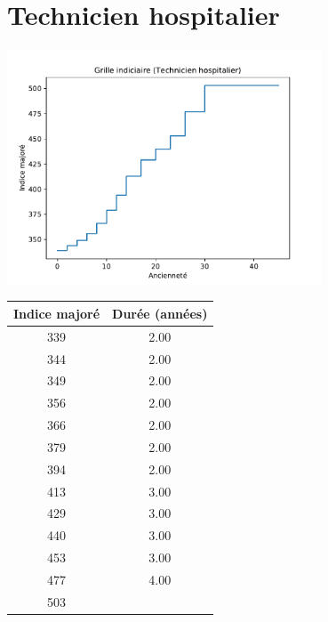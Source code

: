 \newpage 
 
\chapter{Technicien hospitalier} 

\begin{minipage}{0.55\linewidth}\includegraphics[width=0.7\textwidth]{fig/grille_TechHosp.pdf}\end{minipage} 
\begin{minipage}{0.3\linewidth} 
 \begin{center} 

\begin{tabular}[htb]{|c|c|} 
\hline 
 Indice majoré &  Durée (années) \\ 
\hline \hline 
 339 &  2.00 \\ 
\hline 
 344 &  2.00 \\ 
\hline 
 349 &  2.00 \\ 
\hline 
 356 &  2.00 \\ 
\hline 
 366 &  2.00 \\ 
\hline 
 379 &  2.00 \\ 
\hline 
 394 &  2.00 \\ 
\hline 
 413 &  3.00 \\ 
\hline 
 429 &  3.00 \\ 
\hline 
 440 &  3.00 \\ 
\hline 
 453 &  3.00 \\ 
\hline 
 477 &  4.00 \\ 
\hline 
 503 &   \\ 
\hline 
\hline 
\end{tabular} 
\end{center} 
 \end{minipage} 


 \addto{\captionsenglish}{ \renewcommand{\mtctitle}{}} \setcounter{minitocdepth}{2} 
 \minitoc \newpage 

